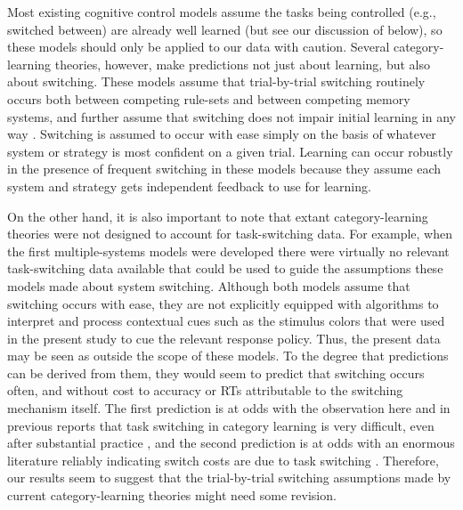\documentclass[doc, floatsintext]{apa7}
\begin{document}
Most existing cognitive control models assume the tasks
being controlled (e.g., switched between) are already well
learned \parencite{botvinick_conflict_2001,
    gilbert_task_2002, blais_item-specific_2007,
    brown_computational_2007, verguts_hebbian_2008,
abrahamse_grounding_2016} (but see our discussion of
\cite{collins_cognitive_2013} below), so these models should
only be applied to our data with caution. Several
category-learning theories, however, make predictions not
just about learning, but also about switching. These models
assume that trial-by-trial switching routinely occurs both
between competing rule-sets and between competing memory
systems, and further assume that switching does not impair
initial learning in any way
\parencite{ashby_neuropsychological_1998,
erickson_rules_1998}. Switching is assumed to occur with
ease simply on the basis of whatever system or strategy is
most confident on a given trial. Learning can occur robustly
in the presence of frequent switching in these models
because they assume each system and strategy gets
independent feedback to use for learning.

On the other hand, it is also important to note that extant
category-learning theories were not designed to account for
task-switching data. For example, when the first
multiple-systems models were developed
\parencite{ashby_neuropsychological_1998,
erickson_rules_1998} there were virtually no relevant
task-switching data available that could be used to guide
the assumptions these models made about system switching.
Although both models assume that switching occurs with ease,
they are not explicitly equipped with algorithms to
interpret and process contextual cues such as the stimulus
colors that were used in the present study to cue the
relevant response policy. Thus, the present data may be seen
as outside the scope of these models. To the degree that
predictions can be derived from them, they would seem to
predict that switching occurs often, and without cost to
accuracy or RTs attributable to the switching mechanism
itself. The first prediction is at odds with the observation
here and in previous reports that task switching in category
learning is very difficult, even after substantial practice
\parencite{crossley_trial-by-trial_2018,
erickson_executive_2008, turner_hierarchical_2017}, and the
second prediction is at odds with an enormous literature
reliably indicating switch costs are due to task switching
\parencite{kiesel_control_2010, monsell_task_2003}.
Therefore, our results seem to suggest that the
trial-by-trial switching assumptions made by current
category-learning theories might need some revision. 
\end{document}

